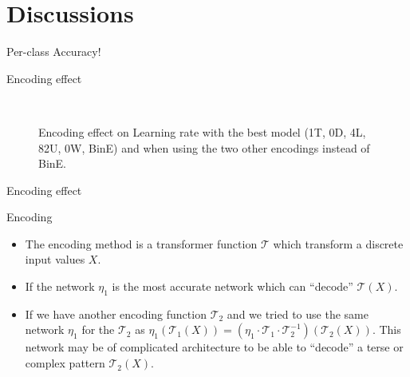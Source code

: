 \section{Discussions}

\begin{frame}[fragile]{Per-class Accuracy!}

\end{frame}


\begin{frame}[fragile]{Encoding effect}
	\begin{figure}[!t]
		  \begin{tikzpicture}
		
		  \end{tikzpicture}
		\caption{Encoding effect on Learning rate with the best model (1T, 0D, 4L, 82U, 0W, BinE) and when using the two other encodings	instead of BinE.}~\label{Fig:ArabicModelsResults}

	\end{figure}

\end{frame}



\begin{frame}[fragile]{Encoding effect}

\begin{block}{Encoding}
	\begin{itemize}
		
		\item The encoding method is a transformer function $\mathcal{T}$ which transform a discrete input values $X$. 
		\item If the network $\eta_1$ is the most accurate network which can ``decode'' $\mathcal{T}(X)$. 
		\item If we have another encoding function $\mathcal{T}_2$ and we tried to use the same network $\eta_1$ for the $\mathcal{T}_2$ as $\eta_1\left(\mathcal{T}_1(X)\right) = \left(\eta_1\cdot\mathcal{T}_1\cdot \mathcal{T}_2^{-1} \right)\left(\mathcal{T}_2(X)\right)$. This network may be of complicated architecture to be able to “decode” a terse or complex pattern $\mathcal{T}_2(X)$.
		
		
	\end{itemize}

	
\end{block}

\end{frame}

